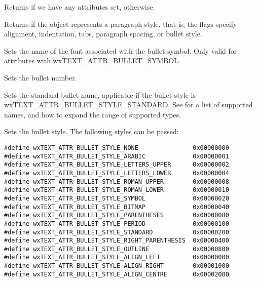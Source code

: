 \label{wxtextattrexisdefault}


Returns \false if we have any attributes set, \true otherwise.

\label{wxtextattrexisparagraphstyle}


Returns \true if the object represents a paragraph style, that is,
the flags specify alignment, indentation, tabs, paragraph spacing, or
bullet style.

\label{wxtextattrexsetbulletfont}


Sets the name of the font associated with the bullet symbol.
Only valid for attributes with wxTEXT\_ATTR\_BULLET\_SYMBOL.

\label{wxtextattrexsetbulletnumber}


Sets the bullet number.

\label{wxtextattrexsetbulletname}


Sets the standard bullet name, applicable if the bullet style is wxTEXT\_ATTR\_BULLET\_STYLE\_STANDARD.
See  for a list
of supported names, and how to expand the range of supported types.

\label{wxtextattrexsetbulletstyle}


Sets the bullet style. The following styles can be passed:

{\small
\begin{verbatim}
#define wxTEXT_ATTR_BULLET_STYLE_NONE               0x00000000
#define wxTEXT_ATTR_BULLET_STYLE_ARABIC             0x00000001
#define wxTEXT_ATTR_BULLET_STYLE_LETTERS_UPPER      0x00000002
#define wxTEXT_ATTR_BULLET_STYLE_LETTERS_LOWER      0x00000004
#define wxTEXT_ATTR_BULLET_STYLE_ROMAN_UPPER        0x00000008
#define wxTEXT_ATTR_BULLET_STYLE_ROMAN_LOWER        0x00000010
#define wxTEXT_ATTR_BULLET_STYLE_SYMBOL             0x00000020
#define wxTEXT_ATTR_BULLET_STYLE_BITMAP             0x00000040
#define wxTEXT_ATTR_BULLET_STYLE_PARENTHESES        0x00000080
#define wxTEXT_ATTR_BULLET_STYLE_PERIOD             0x00000100
#define wxTEXT_ATTR_BULLET_STYLE_STANDARD           0x00000200
#define wxTEXT_ATTR_BULLET_STYLE_RIGHT_PARENTHESIS  0x00000400
#define wxTEXT_ATTR_BULLET_STYLE_OUTLINE            0x00000800
#define wxTEXT_ATTR_BULLET_STYLE_ALIGN_LEFT         0x00000000
#define wxTEXT_ATTR_BULLET_STYLE_ALIGN_RIGHT        0x00001000
#define wxTEXT_ATTR_BULLET_STYLE_ALIGN_CENTRE       0x00002000
\end{verbatim}
}

